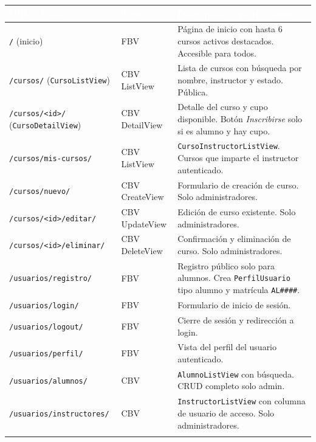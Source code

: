 \documentclass[11pt,letterpaper]{article}
\newcommand{\headrowcolor}{\rowcolor{azulUAZ}}
\newcommand{\headcell}[1]{\textcolor{white}{\textbf{#1}}}
\begin{document}
	\begin{center}\small
		\begin{longtable}{|p{5.2cm}|p{2.4cm}|p{7.2cm}|}
			\hline
			\headrowcolor \headcell{URL / Vista} & \headcell{Tipo} & \headcell{Descripci\'on y restricciones} \\ \hline \endhead
			\texttt{/} (inicio) & FBV & P\'agina de inicio con hasta 6 cursos activos destacados. Accesible para todos. \\ \hline
			\rowcolor{grisAlt}
			\texttt{/cursos/} (\texttt{CursoListView}) & CBV ListView & Lista de cursos con b\'usqueda por nombre, instructor y estado. P\'ublica. \\ \hline
			\texttt{/cursos/<id>/} (\texttt{CursoDetailView}) & CBV DetailView & Detalle del curso y cupo disponible. Bot\'on \emph{Inscribirse} solo si es alumno y hay cupo. \\ \hline
			\rowcolor{grisAlt}
			\texttt{/cursos/mis-cursos/} & CBV ListView & \texttt{CursoInstructorListView}. Cursos que imparte el instructor autenticado. \\ \hline
			\texttt{/cursos/nuevo/} & CBV CreateView & Formulario de creaci\'on de curso. Solo administradores. \\ \hline
			\rowcolor{grisAlt}
			\texttt{/cursos/<id>/editar/} & CBV UpdateView & Edici\'on de curso existente. Solo administradores. \\ \hline
			\texttt{/cursos/<id>/eliminar/} & CBV DeleteView & Confirmaci\'on y eliminaci\'on de curso. Solo administradores. \\ \hline
			\rowcolor{grisAlt}
			\texttt{/usuarios/registro/} & FBV & Registro p\'ublico solo para alumnos. Crea \texttt{PerfilUsuario} tipo alumno y matr\'icula \texttt{AL\#\#\#\#}. \\ \hline
			\texttt{/usuarios/login/} & FBV & Formulario de inicio de sesi\'on. \\ \hline
			\rowcolor{grisAlt}
			\texttt{/usuarios/logout/} & FBV & Cierre de sesi\'on y redirecci\'on a login. \\ \hline
			\texttt{/usuarios/perfil/} & FBV & Vista del perfil del usuario autenticado. \\ \hline
			\rowcolor{grisAlt}
			\texttt{/usuarios/alumnos/} & CBV & \texttt{AlumnoListView} con b\'usqueda. CRUD completo solo admin. \\ \hline
			\texttt{/usuarios/instructores/} & CBV & \texttt{InstructorListView} con columna de usuario de acceso. Solo administradores. \\ \hline
			\rowcolor{grisAlt}

\end{longtable}
\end{center}
\end{document}
